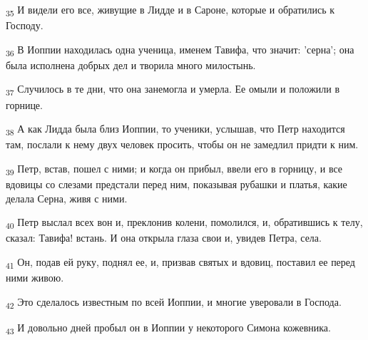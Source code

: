 \begin{tcolorbox}
\textsubscript{35} И видели его все, живущие в Лидде и в Сароне, которые и обратились к Господу.
\end{tcolorbox}
\begin{tcolorbox}
\textsubscript{36} В Иоппии находилась одна ученица, именем Тавифа, что значит: 'серна'; она была исполнена добрых дел и творила много милостынь.
\end{tcolorbox}
\begin{tcolorbox}
\textsubscript{37} Случилось в те дни, что она занемогла и умерла. Ее омыли и положили в горнице.
\end{tcolorbox}
\begin{tcolorbox}
\textsubscript{38} А как Лидда была близ Иоппии, то ученики, услышав, что Петр находится там, послали к нему двух человек просить, чтобы он не замедлил придти к ним.
\end{tcolorbox}
\begin{tcolorbox}
\textsubscript{39} Петр, встав, пошел с ними; и когда он прибыл, ввели его в горницу, и все вдовицы со слезами предстали перед ним, показывая рубашки и платья, какие делала Серна, живя с ними.
\end{tcolorbox}
\begin{tcolorbox}
\textsubscript{40} Петр выслал всех вон и, преклонив колени, помолился, и, обратившись к телу, сказал: Тавифа! встань. И она открыла глаза свои и, увидев Петра, села.
\end{tcolorbox}
\begin{tcolorbox}
\textsubscript{41} Он, подав ей руку, поднял ее, и, призвав святых и вдовиц, поставил ее перед ними живою.
\end{tcolorbox}
\begin{tcolorbox}
\textsubscript{42} Это сделалось известным по всей Иоппии, и многие уверовали в Господа.
\end{tcolorbox}
\begin{tcolorbox}
\textsubscript{43} И довольно дней пробыл он в Иоппии у некоторого Симона кожевника.
\end{tcolorbox}
